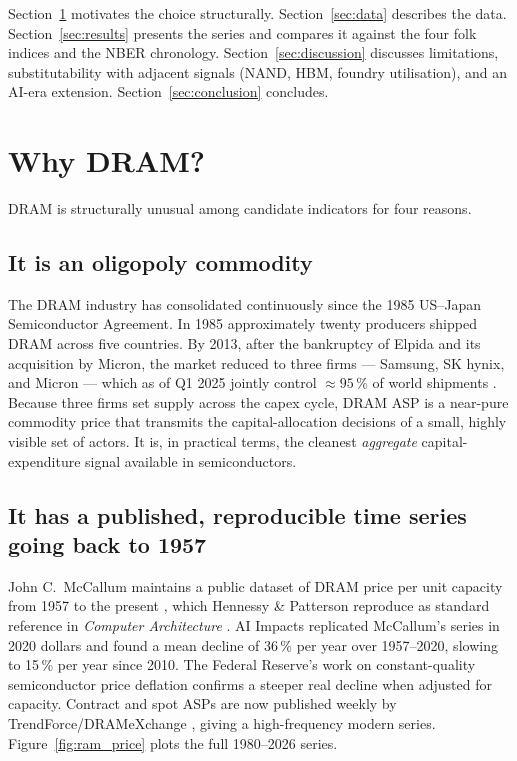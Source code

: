 \documentclass[11pt,a4paper]{article}
\begin{document}
Section~\ref{sec:why} motivates the choice structurally. Section~\ref{sec:data} describes the data. Section~\ref{sec:results} presents the series and compares it against the four folk indices and the NBER chronology. Section~\ref{sec:discussion} discusses limitations, substitutability with adjacent signals (NAND, HBM, foundry utilisation), and an AI-era extension. Section~\ref{sec:conclusion} concludes.

\section{Why DRAM?}
\label{sec:why}

DRAM is structurally unusual among candidate indicators for four reasons.

\subsection{It is an oligopoly commodity}

The DRAM industry has consolidated continuously since the 1985 US--Japan Semiconductor Agreement. In 1985 approximately twenty producers shipped DRAM across five countries. By 2013, after the bankruptcy of Elpida and its acquisition by Micron, the market reduced to three firms --- Samsung, SK hynix, and Micron --- which as of Q1 2025 jointly control $\approx 95\,\%$ of world shipments \citep{lapedus2025,noobfeed2024}. Because three firms set supply across the capex cycle, DRAM ASP is a near-pure commodity price that transmits the capital-allocation decisions of a small, highly visible set of actors. It is, in practical terms, the cleanest \emph{aggregate} capital-expenditure signal available in semiconductors.

\subsection{It has a published, reproducible time series going back to 1957}

John C.\ McCallum maintains a public dataset of DRAM price per unit capacity from 1957 to the present \citep{mccallum2024}, which Hennessy \& Patterson reproduce as standard reference in \textit{Computer Architecture} \citep{hennessy2019}. AI Impacts \citep{aiimpacts2020} replicated McCallum's series in 2020 dollars and found a mean decline of 36\,\% per year over 1957--2020, slowing to 15\,\% per year since 2010. The Federal Reserve's work on constant-quality semiconductor price deflation \citep{aizcorbe2006} confirms a steeper real decline when adjusted for capacity. Contract and spot ASPs are now published weekly by TrendForce/DRAMeXchange \citep{trendforce2026}, giving a high-frequency modern series. Figure~\ref{fig:ram_price} plots the full 1980--2026 series.
\end{document}
